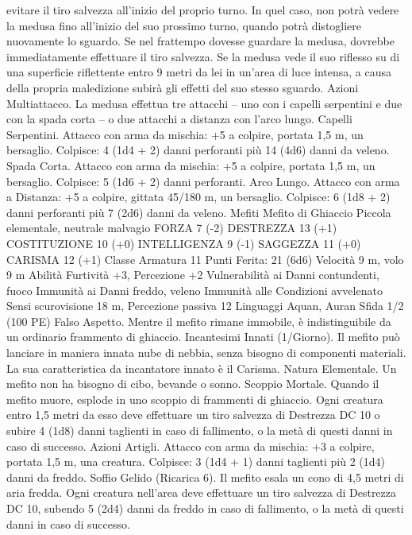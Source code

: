 \begin{multicols}{2}
evitare il tiro salvezza all’inizio del proprio turno. In quel caso,
non potrà vedere la medusa fino all’inizio del suo prossimo
turno, quando potrà distogliere nuovamente lo sguardo. Se nel
frattempo dovesse guardare la medusa, dovrebbe
immediatamente effettuare il tiro salvezza.
Se la medusa vede il suo riflesso su di una superficie riflettente
entro 9 metri da lei in un’area di luce intensa, a causa della
propria maledizione subirà gli effetti del suo stesso sguardo.
Azioni
Multiattacco. La medusa effettua tre attacchi – uno con i capelli
serpentini e due con la spada corta – o due attacchi a distanza
con l’arco lungo.
Capelli Serpentini. Attacco con arma da mischia: +5 a colpire,
portata 1,5 m, un bersaglio.
Colpisce: 4 (1d4 + 2) danni perforanti più 14 (4d6) danni da
veleno.
Spada Corta. Attacco con arma da mischia: +5 a colpire, portata
1,5 m, un bersaglio.
Colpisce: 5 (1d6 + 2) danni perforanti.
Arco Lungo. Attacco con arma a Distanza: +5 a colpire, gittata
45/180 m, un bersaglio.
Colpisce: 6 (1d8 + 2) danni perforanti più 7 (2d6) danni da
veleno.
Mefiti
Mefito di Ghiaccio
Piccola elementale, neutrale malvagio
FORZA 7 (-2)
DESTREZZA 13 (+1)
COSTITUZIONE 10 (+0)
INTELLIGENZA 9 (-1)
SAGGEZZA 11 (+0)
CARISMA 12 (+1)
Classe Armatura 11
\hspace*{0pt}\hfill{Punti Ferita}: 21 (6d6)
Velocità 9 m, volo 9 m
Abilità Furtività +3, Percezione +2
Vulnerabilità ai Danni contundenti, fuoco
Immunità ai Danni freddo, veleno
Immunità alle Condizioni avvelenato
Sensi scurovisione 18 m, Percezione passiva 12
Linguaggi Aquan, Auran
Sfida 1/2 (100 PE)
Falso Aspetto. Mentre il mefito rimane immobile, è
indistinguibile da un ordinario frammento di ghiaccio.
Incantesimi Innati (1/Giorno). Il mefito può lanciare in maniera
innata nube di nebbia, senza bisogno di componenti materiali. La
sua caratteristica da incantatore innato è il Carisma.
Natura Elementale. Un mefito non ha bisogno di cibo, bevande
o sonno.
Scoppio Mortale. Quando il mefito muore, esplode in uno
scoppio di frammenti di ghiaccio. Ogni creatura entro 1,5 metri
da esso deve effettuare un tiro salvezza di Destrezza DC 10 o
subire 4 (1d8) danni taglienti in caso di fallimento, o la metà di
questi danni in caso di successo.
Azioni
Artigli. Attacco con arma da mischia: +3 a colpire, portata 1,5
m, una creatura.
Colpisce: 3 (1d4 + 1) danni taglienti più 2 (1d4) danni da freddo.
Soffio Gelido (Ricarica 6). Il mefito esala un cono di 4,5 metri di
aria fredda. Ogni creatura nell’area deve effettuare un tiro
salvezza di Destrezza DC 10, subendo 5 (2d4) danni da freddo in
caso di fallimento, o la metà di questi danni in caso di successo.

\end{multicols}
